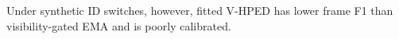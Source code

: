 Under synthetic ID switches, however, fitted V-HPED has lower frame F1 than visibility-gated EMA and is poorly calibrated.
